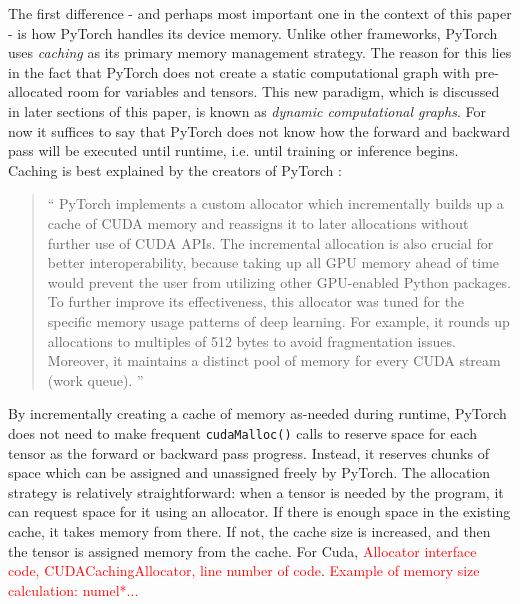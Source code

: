 \documentclass[12pt,letterpaper]{article}
\newcommand\myworries[1]{\textcolor{red}{#1}}
\begin{document}
\label{sec:memory_caching}
The first difference - and perhaps most important one in the context of this paper - is how PyTorch handles its device memory. Unlike other frameworks, PyTorch uses \textit{caching} as its primary memory management strategy. The reason for this lies in the fact that PyTorch does not create a static computational graph with pre-allocated room for variables and tensors. This new paradigm, which is discussed in later sections of this paper, is known as \textit{dynamic computational graphs}. For now it suffices to say that PyTorch does not know how the forward and backward pass will be executed until runtime, i.e. until training or inference begins. Caching is best explained by the creators of PyTorch \cite{pytorch_paper}:

\begin{quote}
\enquote{
PyTorch implements a custom allocator which incrementally builds up a cache of CUDA memory and reassigns it to later allocations without further use of CUDA APIs. The incremental allocation is also crucial for better interoperability, because taking up all GPU memory ahead of time would prevent the user from utilizing other GPU-enabled Python packages. To further improve its effectiveness, this allocator was tuned for the specific memory usage patterns of deep learning. For example, it rounds up allocations to multiples of 512 bytes to avoid fragmentation issues. Moreover, it maintains a distinct pool of memory for every CUDA stream (work queue).
}
\end{quote}

By incrementally creating a cache of memory as-needed during runtime, PyTorch does not need to make frequent \texttt{cudaMalloc()} calls to reserve space for each tensor as the forward or backward pass progress. Instead, it reserves chunks of space which can be assigned and unassigned freely by PyTorch. The allocation strategy is relatively straightforward: when a tensor is needed by the program, it can request space for it using an allocator. If there is enough space in the existing cache, it takes memory from there. If not, the cache size is increased, and then the tensor is assigned memory from the cache. For Cuda, \myworries{Allocator interface code, CUDACachingAllocator, line number of code}.
\myworries{Example of memory size calculation: numel*...}
\par 
\end{document}
